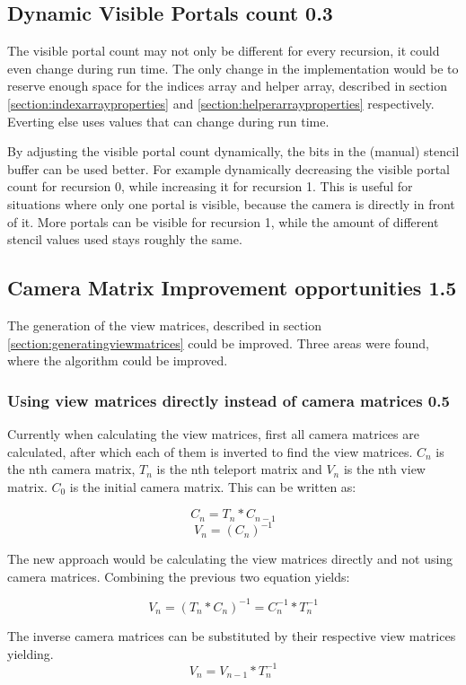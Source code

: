 \subsection{Dynamic Visible Portals count 0.3}
The visible portal count may not only be different for every recursion, it could even change during run time. The only change in the implementation would be to reserve enough space for the indices array and helper array, described in section \ref{section:indexarrayproperties} and \ref{section:helperarrayproperties} respectively. Everting else uses values that can change during run time.

By adjusting the visible portal count dynamically, the bits in the (manual) stencil buffer can be used better. For example dynamically decreasing the visible portal count for recursion 0, while increasing it for recursion 1. This is useful for situations where only one portal is visible, because the camera is directly in front of it. More portals can be visible for recursion 1, while the amount of different stencil values used stays roughly the same.


\subsection{Camera Matrix Improvement opportunities 1.5}
The generation of the view matrices, described in section \ref{section:generatingviewmatrices} could be improved. Three areas were found, where the algorithm could be improved.

\subsubsection{Using view matrices directly instead of camera matrices 0.5}
Currently when calculating the view matrices, first all camera matrices are calculated, after which each of them is inverted to find the view matrices. $C_n$ is the nth camera matrix, $T_n$ is the nth teleport matrix and $V_n$ is the nth view matrix. $C_0$ is the initial camera matrix. This can be written as:

$$C_n = T_{n} * C_{n-1}$$
$$V_n = (C_{n})^{-1}$$

The new approach would be calculating the view matrices directly and not using camera matrices.
Combining the previous two equation yields:

$$V_n = (T_n * C_n)^{-1} = C_n^{-1} * T_n^{-1}$$

The inverse camera matrices can be substituted by their respective view matrices yielding.
$$V_n = V_{n-1} * T_n^{-1}$$

